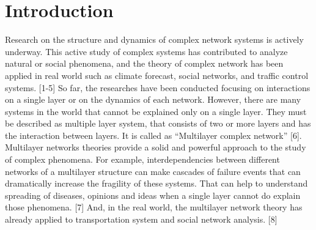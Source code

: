 \documentclass[english]{cccconf}
\begin{document}


\section{Introduction}

Research on the structure and dynamics of complex network systems is actively underway. This active study of complex systems has contributed to analyze natural or social phenomena, and the theory of complex network has been applied in real world such as climate forecast, social networks, and traffic control systems. [1-5]
So far, the researches have been conducted focusing on interactions on a single layer or on the dynamics of each network. However, there are many systems in the world that cannot be explained only on a single layer. They must be described as multiple layer system, that consists of two or more layers and has the interaction between layers. It is called as ``Multilayer complex network'' [6]. 
Multilayer networks theories provide a solid and powerful approach to the study of complex phenomena. For example, interdependencies between different networks of a multilayer structure can make cascades of failure events that can dramatically increase the fragility of these systems. That can help to understand spreading of diseases, opinions and ideas when a single layer cannot do explain those phenomena. [7] And, in the real world, the multilayer network theory has already applied to transportation system and social network analysis. [8] 
\end{document}
